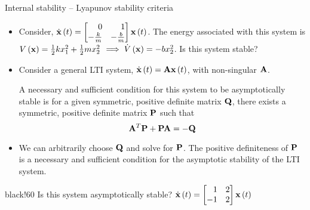 \documentclass[aspectratio=169]{beamer}
\def\mf{\ensuremath\mathbf}
\def\lp{\ensuremath\left(}
\def\rp{\ensuremath\right)}
\def\bmx{\ensuremath\begin{bmatrix*}[r]}
\def\emx{\ensuremath\end{bmatrix*}}
\newcommand{\demoex}[2]{\onslide<#1->\begin{color}{black!60} #2 \end{color}}
\newcommand{\ct}[1]{\lp #1\rp}
\begin{document}
\begin{frame}{Internal stability -- Lyapunov stability criteria}
\begin{itemize}
    \item Consider, $\dot{\mf{x}}\ct{t} = \bmx 0 & 1 \\ -\frac{k}{m} & -\frac{b}{m} \emx\mf{x}\ct{t}$. The energy associated with this system is $V\ct{\mf{x}} = \frac{1}{2}kx_1^2 + \frac{1}{2}mx_2^2$ $\implies \dot{V}\ct{\mf{x}} = -b x_2^2$. Is this system stable?

    \item Consider a general LTI system, $\dot{\mf{x}}\ct{t} = \mf{A}\mf{x}\ct{t}$, with non-singular $\mf{A}$.

    A necessary and sufficient condition for this system to be asymptotically stable is for a given symmetric, positive definite matrix $\mf{Q}$, there exists a symmetric, positive definite matrix $\mf{P}$ such that
    \[ \mf{A}^T\mf{P} + \mf{P}\mf{A} = - \mf{Q} \] 

    \item We can arbitrarily choose $\mf{Q}$ and solve for $\mf{P}$. The positive definiteness of $\mf{P}$ is a necessary and sufficient condition for the asymptotic stability of the LTI system.
\end{itemize}
\demoex{2}{Is this system asymptotically stable? $\dot{\mf{x}}\ct{t} = \bmx 1 & 2 \\ -1 & 2 \emx\mf{x}\ct{t}$}
\end{frame}
\end{document}
